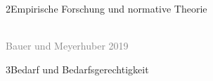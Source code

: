 \documentclass[xcolor=table,9pt,aspectratio=169]{beamer}
\begin{document}
\begin{frame}{\vspace*{10mm}2\hspace*{1em}Empirische Forschung und normative Theorie}
\begin{multicols}{2}
\begin{center}
   \vspace{1cm}
   \\
   \footnotesize{\textcolor{gray}{Bauer und Meyerhuber 2019}}
   \vspace{1cm}
\end{center}
\end{multicols}
\end{frame}


\begin{frame}
\begin{overlayarea}{\textwidth}{0.81\paperheight}{
   \vspace*{11mm}
   \textcolor{uolblue}
   {3\hspace*{1em}Bedarf und Bedarfsgerechtigkeit}
}
\vspace*{7mm}
\end{overlayarea}
\end{frame}
\end{document}
